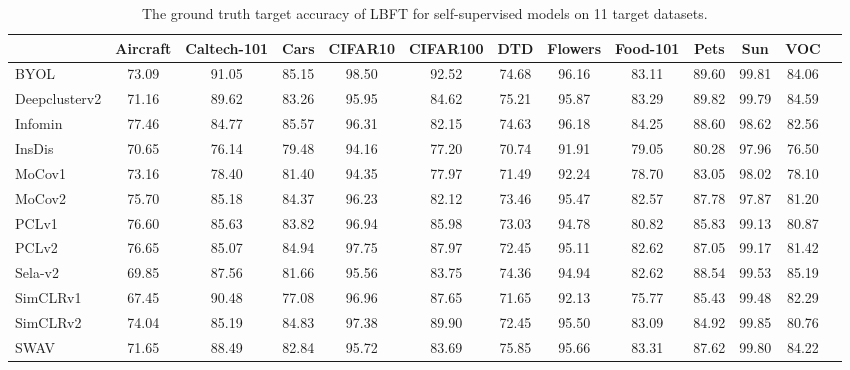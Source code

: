 \begin{table*}\setlength\tabcolsep{5pt}
\footnotesize

    \centering
    \caption{The ground truth target accuracy of LBFT for self-supervised models on 11 target datasets.}
    \label{tab:ground_truth-LBFT}
    \begin{adjustbox}{max width=\textwidth, margin=0em}
    \begin{tabular}{lcccccccccccc}
        \toprule
        & Aircraft & Caltech-101 & Cars  & CIFAR10 & CIFAR100 & DTD   & Flowers & Food-101 & Pets  & Sun & VOC  \\
        \midrule
        BYOL & 73.09 & 91.05 & 85.15 & 98.50 & 92.52 & 74.68 & 96.16 & 83.11 & 89.60 & 99.81 & 84.06 \\
        Deepclusterv2 & 71.16 & 89.62 & 83.26 & 95.95 & 84.62 & 75.21 & 95.87 & 83.29 & 89.82 & 99.79 & 84.59 \\
        Infomin & 77.46 & 84.77 & 85.57 & 96.31 & 82.15 & 74.63 & 96.18 & 84.25 & 88.60 & 98.62 & 82.56 \\
        InsDis & 70.65 & 76.14 & 79.48 & 94.16 & 77.20 & 70.74 & 91.91 & 79.05 & 80.28 & 97.96 & 76.50 \\
        MoCov1 & 73.16 & 78.40 & 81.40 & 94.35 & 77.97 & 71.49 & 92.24 & 78.70 & 83.05 & 98.02 & 78.10 \\
        MoCov2 & 75.70 & 85.18 & 84.37 & 96.23 & 82.12 & 73.46 & 95.47 & 82.57 & 87.78 & 97.87 & 81.20 \\
        PCLv1 & 76.60 & 85.63 & 83.82 & 96.94 & 85.98 & 73.03 & 94.78 & 80.82 & 85.83 & 99.13 & 80.87 \\
        PCLv2 & 76.65 & 85.07 & 84.94 & 97.75 & 87.97 & 72.45 & 95.11 & 82.62 & 87.05 & 99.17 & 81.42 \\
        Sela-v2 & 69.85 & 87.56 & 81.66 & 95.56 & 83.75 & 74.36 & 94.94 & 82.62 & 88.54 & 99.53 & 85.19 \\
        SimCLRv1 & 67.45 & 90.48 & 77.08 & 96.96 & 87.65 & 71.65 & 92.13 & 75.77 & 85.43 & 99.48 & 82.29 \\
        SimCLRv2 & 74.04 & 85.19 & 84.83 & 97.38 & 89.90 & 72.45 & 95.50 & 83.09 & 84.92 & 99.85 & 80.76 \\
        SWAV & 71.65 & 88.49 & 82.84 & 95.72 & 83.69 & 75.85 & 95.66 & 83.31 & 87.62 & 99.80 & 84.22 \\
        \bottomrule
    \end{tabular}
\end{adjustbox}
\end{table*}

